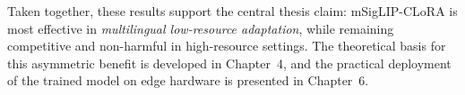 \documentclass[../main.tex]{subfiles}
\begin{document}
\noindent Taken together, these results support the central thesis claim: mSigLIP-CLoRA is most effective in \textit{multilingual low-resource adaptation}, while remaining competitive and non-harmful in high-resource settings. The theoretical basis for this asymmetric benefit is developed in Chapter~4, and the practical deployment of the trained model on edge hardware is presented in Chapter~6.
\end{document}
